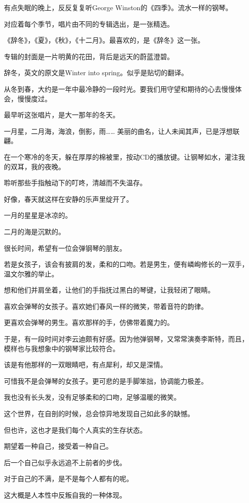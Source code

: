 	\endwriting



		有点失眠的晚上，反反复复听George Winston的《四季》。流水一样的钢琴。\par
		对应着每个季节，唱片由不同的专辑选出，是一张精选。\par
		《辞冬》，《夏》，《秋》，《十二月》。最喜欢的，是《辞冬》这一张。\par
		专辑的封面是一片明黄的花田，背后是远天的蔚蓝澄碧。\par
		辞冬，英文的原文是Winter into spring。似乎是贴切的翻译。\par
		从冬到春，大约是一年中最冷静的一段时光。要我们用守望和期待的心去慢慢体会，慢慢度过。\par
		最早听这张唱片，是大一那年的冬天。\par
		一月星，二月海，海浪，倒影，雨…… 美丽的曲名，让人未闻其声，已是浮想联翩。\par
		在一个寒冷的冬天，躲在厚厚的棉被里，按动CD的播放键。让钢琴如水，灌注我的双耳，我的夜晚。\par
		聆听那些手指触动下的叮咚，清越而不失温存。\par
		好像，春天就这样在安静的乐声里绽开了。\par
		一月的星星是冰凉的。\par
		二月的海是沉默的。

		\vspace{1em}
		很长时间，希望有一位会弹钢琴的朋友。\par
		若是女孩子，该会有披肩的发，柔和的口吻。若是男生，便有嶙峋修长的一双手，温文尔雅的举止。\par
		想和他们并肩坐着，让他们的手指抚过黑白的琴键，让我轻闭了眼睛。\par
		喜欢会弹琴的女孩子。喜欢她们春风一样的微笑，带着音符的韵律。\par
		更喜欢会弹琴的男生。喜欢那样的手，仿佛带着魔力的。\par
		于是，有一段时间对李云迪颇有好感。因为他弹钢琴，又常常演奏李斯特，而且，模样也与我想象中的钢琴家比较符合。\par
		该是有他那样的一双眼睛吧，有点犀利，却又是深情。

		\vspace{1em}
		可惜我不是会弹琴的女孩子。更可悲的是手脚笨拙，协调能力极差。\par
		我也没有长头发，没有足够柔和的口吻，足够温暖的微笑。\par
		这个世界，在自剖的时候，总会惊异地发现自己如此多的缺憾。\par
		但也许，这也才是我们每个人真实的生存状态。\par
		期望着一种自己，接受着一种自己。\par
		后一个自己似乎永远追不上前者的步伐。\par
		对于自己的不满，是不是每个人都有的呢。\par
		这大概是人本性中反叛自我的一种体现。

